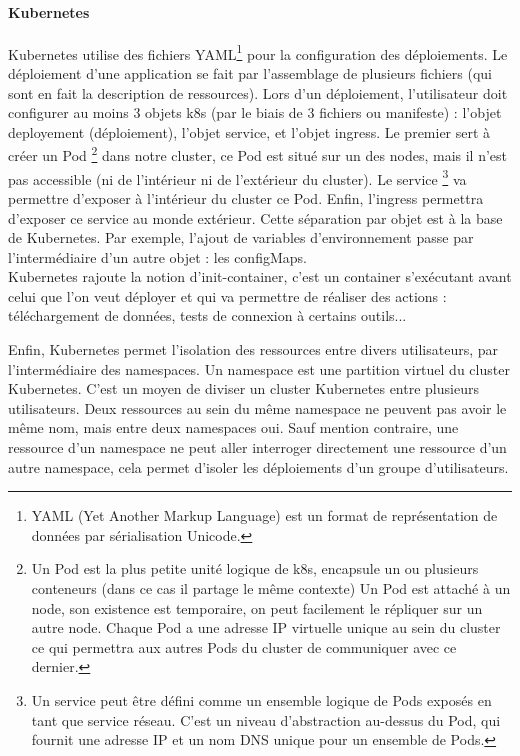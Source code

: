 \documentclass[11pt,fleqn]{book} %
\begin{document}
\paragraph{Kubernetes}
Kubernetes utilise des fichiers YAML\footnote{YAML (Yet Another Markup Language) est un format de représentation de données par sérialisation Unicode.} pour la configuration des déploiements. Le déploiement d'une application se fait par l'assemblage de plusieurs fichiers (qui sont en fait la description de ressources). Lors d'un déploiement, l'utilisateur doit configurer au moins 3 objets k8s (par le biais de 3 fichiers ou manifeste) : l'objet deployement (déploiement), l'objet  service, et l'objet ingress. Le premier sert à créer un Pod \footnote{Un Pod est la plus petite unité logique de k8s, encapsule un ou plusieurs conteneurs (dans ce cas il partage le même contexte) Un Pod est attaché à un node, son existence est temporaire, on peut facilement le répliquer sur un autre node. Chaque Pod a une adresse IP virtuelle unique au sein du cluster ce qui permettra aux autres Pods du cluster de communiquer avec ce dernier.} dans notre cluster, ce Pod est situé sur un des nodes, mais il n'est pas accessible (ni de l'intérieur ni de l'extérieur du cluster). Le service \footnote{Un service peut être défini comme un ensemble logique de Pods exposés en tant que service réseau. C'est un niveau d'abstraction au-dessus du Pod, qui fournit une adresse IP et un nom DNS unique pour un ensemble de Pods.} va permettre d'exposer à l'intérieur du cluster ce Pod. Enfin, l'ingress permettra d'exposer ce service au monde extérieur. Cette séparation par objet est à la base de Kubernetes. Par exemple, l'ajout de variables d'environnement passe par l'intermédiaire d'un autre objet : les configMaps.\\

Kubernetes rajoute la notion d'init-container, c'est un container s'exécutant avant celui que l'on veut déployer et qui va permettre de réaliser des actions : téléchargement de données, tests de connexion à certains outils... \newline


Enfin, Kubernetes permet l'isolation des ressources entre divers utilisateurs, par l'intermédiaire des namespaces. Un namespace est une partition virtuel du cluster Kubernetes. C’est un moyen de diviser un cluster Kubernetes entre plusieurs utilisateurs. Deux ressources au sein du même namespace ne peuvent pas avoir le même nom, mais entre deux namespaces oui. Sauf mention contraire, une ressource d’un namespace ne peut aller interroger directement une ressource d’un autre namespace, cela permet d’isoler les déploiements d’un groupe d’utilisateurs.
\end{document}

